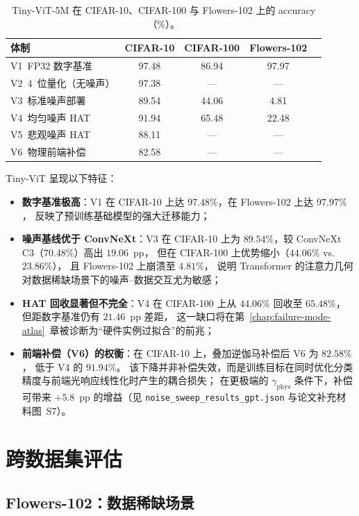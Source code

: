 \begin{table}[htbp]
\centering
\caption{Tiny-ViT-5M 在 CIFAR-10、CIFAR-100 与 Flowers-102 上的 accuracy（\%）。}
\label{tab:tinyvit-results}
\begin{tabular}{@{}lcccc@{}}
\toprule
\textbf{体制} & \textbf{CIFAR-10} & \textbf{CIFAR-100} & \textbf{Flowers-102} \\
\midrule
V1~FP32 数字基准 & 97.48 & 86.94 & 97.97 \\
V2~4~位量化（无噪声） & 97.38 & --- & --- \\
V3~标准噪声部署 & 89.54 & 44.06 & 4.81 \\
V4~均匀噪声 HAT & 91.94 & 65.48 & 22.48 \\
V5~悲观噪声 HAT & 88.11 & --- & --- \\
V6~物理前端补偿 & 82.58 & --- & --- \\
\bottomrule
\end{tabular}
\end{table}

Tiny-ViT 呈现以下特征：
\begin{itemize}
    \item \textbf{数字基准极高}：V1 在 CIFAR-10 上达 $97.48\%$，在 Flowers-102 上达 $97.97\%$，
    反映了预训练基础模型的强大迁移能力；
    \item \textbf{噪声基线优于 ConvNeXt}：V3 在 CIFAR-10 上为 $89.54\%$，较 ConvNeXt C3（$70.48\%$）高出 $19.06$~pp，
    但在 CIFAR-100 上优势缩小（$44.06\%$ vs.~$23.86\%$），
    且 Flowers-102 上崩溃至 $4.81\%$，
    说明 Transformer 的注意力几何对数据稀缺场景下的噪声--数据交互尤为敏感；
    \item \textbf{HAT 回收显著但不完全}：V4 在 CIFAR-100 上从 $44.06\%$ 回收至 $65.48\%$，
    但距数字基准仍有 $21.46$~pp 差距，
    这一缺口将在第~\ref{chap:failure-mode-atlas}~章被诊断为``硬件实例过拟合''的前兆；
    \item \textbf{前端补偿（V6）的权衡}：在 CIFAR-10 上，叠加逆伽马补偿后 V6 为 $82.58\%$，
    低于 V4 的 $91.94\%$。
    该下降并非补偿失效，而是训练目标在同时优化分类精度与前端光响应线性化时产生的耦合损失；
    在更极端的 $\gamma_{\mathrm{phys}}$ 条件下，补偿可带来 $+5.8$~pp 的增益（见 \texttt{noise\_sweep\_results\_gpt.json} 与论文补充材料图~S7）。
\end{itemize}

\section{跨数据集评估}

\subsection{Flowers-102：数据稀缺场景}

